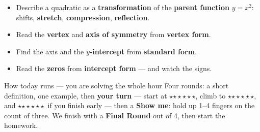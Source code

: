\documentclass[aspectratio=169, 11pt]{beamer}
\newcommand{\rung}[1]{{\color{goldacc}\ifcase#1\or$\star$\or$\star\star$\or$\star\star\star$\fi}}
\begin{document}
\begin{frame}[t, plain]
  \begin{itemize}\setlength{\itemsep}{4pt}
    \item Describe a quadratic as a \textbf{transformation} of the \textbf{parent function}
          $y=x^2$: shifts, \textbf{stretch}, \textbf{compression}, \textbf{reflection}.
    \item Read the \textbf{vertex} and \textbf{axis of symmetry} from \textbf{vertex form}.
    \item Find the axis and the \textbf{$y$-intercept} from \textbf{standard form}.
    \item Read the \textbf{zeros} from \textbf{intercept form} --- and watch the signs.
  \end{itemize}
  \vspace{3pt}
  \begin{block}{How today runs --- you are solving the whole hour}
    Four rounds: a short definition, one example, then \textbf{your turn} --- start at
    \rung1, climb to \rung2, and \rung3\ if you finish early --- then a \textbf{Show me}: hold up
    1--4 fingers on the count of three. We finish with a \textbf{Final Round} out of 4, then
    start the homework.
  \end{block}
\end{frame}
\end{document}
